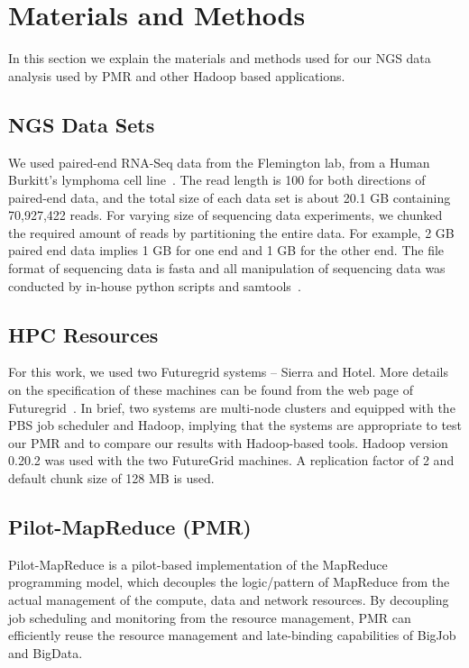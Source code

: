 \documentclass{acm_proc_article-sp}
\begin{document}
\section{Materials and Methods}\label{sec:materials_and_methods} 
In this section we explain the materials and methods used for our NGS data analysis used by PMR and other Hadoop based applications.

\subsection{NGS Data Sets}
We used paired-end RNA-Seq data from the Flemington lab, from a Human
Burkitt's lymphoma cell line~\cite{erik_2010}. The read length is 100
for both directions of paired-end data, and the total size of each
data set is about 20.1 GB containing 70,927,422 reads.  For varying
size of sequencing data experiments, we chunked the required amount of
reads by partitioning the entire data.  For example, 2 GB paired end
data implies 1 GB for one end and 1 GB for the other end.  The file
format of sequencing data is fasta and all manipulation of sequencing
data was conducted by in-house python scripts and
samtools~\cite{samtools}.

\subsection{HPC Resources}

For this work, we used two Futuregrid systems -- Sierra and Hotel.
More details on the specification of these machines can be found from
the web page of Futuregrid~\cite{futuregrid_url}.  In brief, two
systems are multi-node clusters and equipped with the PBS job
scheduler and Hadoop, implying that the systems are appropriate to
test our PMR and to compare our results with Hadoop-based
tools. Hadoop version 0.20.2 was used with the two FutureGrid
machines. A replication factor of 2 and default chunk size of 128 MB
is used.

\subsection{Pilot-MapReduce (PMR)}

Pilot-MapReduce is a pilot-based implementation of the MapReduce
programming model, which decouples the logic/pattern of MapReduce from
the actual management of the compute, data and network resources. By
decoupling job scheduling and monitoring from the resource management,
PMR can efficiently reuse the resource management and late-binding
capabilities of BigJob and BigData.
\end{document}
